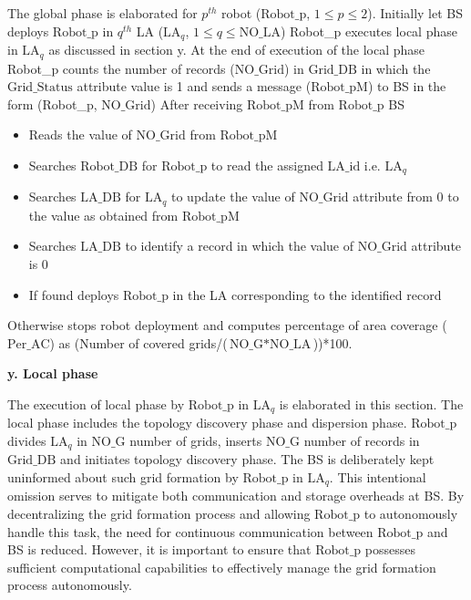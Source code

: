 \documentclass{article}
\begin{document}
The global phase is elaborated for $p^{th}$ robot ($\text{Robot\_p}$, $1 \le p \le 2$). Initially let BS deploys $\text{Robot\_p}$ in $q^{th}$ LA ($\text{LA}_q$, $1 \le q \le \text{NO\_LA}$)
Robot\_p executes local phase in $\text{LA}_q$ as discussed in section y. At the end of execution of the local phase Robot\_p counts the number of records ($\text{NO\_Grid}$) in $\text{Grid\_DB}$ in which the $\text{Grid\_Status}$ attribute value is 1 and sends a message ($\text{Robot\_pM}$) to BS in the form (Robot\_p, $\text{NO\_Grid}$)
After receiving $\text{Robot\_pM}$ from $\text{Robot\_p}$ BS
\begin{itemize}
    \item Reads the value of $\text{NO\_Grid}$ from $\text{Robot\_pM}$
    \item Searches $\text{Robot\_DB}$ for $\text{Robot\_p}$ to read the assigned $\text{LA\_id}$ i.e. $\text{LA}_q$
    \item Searches $\text{LA\_DB}$ for $\text{LA}_q$ to update the value of $\text{NO\_Grid}$ attribute from 0 to the value as obtained from $\text{Robot\_pM}$
    \item Searches $\text{LA\_DB}$ to identify a record in which the value of $\text{NO\_Grid}$ attribute is 0
    \item If found deploys $\text{Robot\_p}$ in the LA corresponding to the identified record
\end{itemize}
Otherwise stops robot deployment and computes percentage of area coverage ($\text{Per\_AC}$) as (Number of covered grids/($\text{NO\_G} * \text{NO\_LA}$))*100.

\noindent\textbf{y. Local phase}

The execution of local phase by $\text{Robot\_p}$ in $\text{LA}_q$ is elaborated in this section. The local phase includes the topology discovery phase and dispersion phase. $\text{Robot\_p}$ divides $\text{LA}_q$ in $\text{NO\_G}$ number of grids, inserts $\text{NO\_G}$ number of records in $\text{Grid\_DB}$ and initiates topology discovery phase. The BS is deliberately kept uninformed about such grid formation by $\text{Robot\_p}$ in $\text{LA}_q$. This intentional omission serves to mitigate both communication and storage overheads at BS. By decentralizing the grid formation process and allowing $\text{Robot\_p}$ to autonomously handle this task, the need for continuous communication between $\text{Robot\_p}$ and BS is reduced. However, it is important to ensure that $\text{Robot\_p}$ possesses sufficient computational capabilities to effectively manage the grid formation process autonomously.
\end{document}
